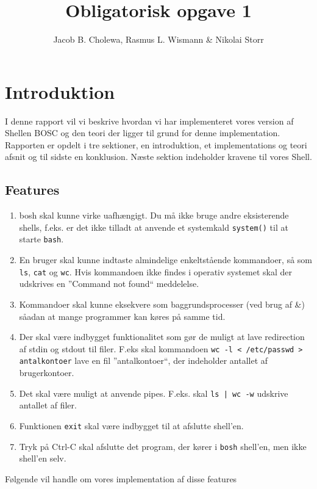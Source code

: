 \documentclass[danish]{report}
\title{Obligatorisk opgave 1}
\author{Jacob B. Cholewa, Rasmus L. Wismann \& Nikolai Storr }
\begin{document}
\maketitle
\newpage
\tableofcontents
\newpage

\chapter{Introduktion}

I denne rapport vil vi beskrive hvordan vi har implementeret vores version af Shellen BOSC og den teori der ligger til grund for denne implementation. Rapporten er opdelt i tre sektioner, en introduktion, et implementations og teori afsnit og til sidste en konklusion. Næste sektion indeholder kravene til vores Shell.  

\section{Features}
\begin{enumerate}
\item bosh skal kunne virke uafhængigt. Du må ikke bruge andre eksisterende shells, f.eks. er det ikke tilladt at anvende et systemkald {\tt system()} til at starte {\tt bash}.
\item En bruger skal kunne indtaste almindelige enkeltstående kommandoer, så som {\tt ls}, {\tt cat} og {\tt wc}. Hvis kommandoen ikke findes i operativ systemet skal der udskrives en ”Command not found“ meddelelse.
\item Kommandoer skal kunne eksekvere som baggrundsprocesser (ved brug af \&) såadan at mange programmer kan køres på samme tid.
\item Der skal være indbygget funktionalitet som gør de muligt at lave redirection af stdin og stdout til filer. F.eks skal kommandoen {\tt wc -l < /etc/passwd > antalkontoer} lave en fil ”antalkontoer“, der indeholder antallet af brugerkontoer.
\item Det skal være muligt at anvende pipes. F.eks. skal {\tt ls | wc -w} udskrive antallet af filer.
\item Funktionen {\tt exit} skal være indbygget til at afslutte shell’en.
\item Tryk på Ctrl-C skal afslutte det program, der kører i {\tt bosh} shell’en, men ikke shell’en selv.
\end{enumerate}

Følgende vil handle om vores implementation af disse features 
\end{document}
